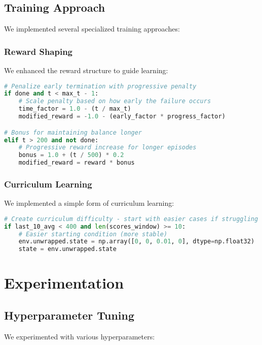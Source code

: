 \documentclass[11pt,a4paper]{article}
\begin{document}
\subsection{Training Approach}

We implemented several specialized training approaches:

\subsubsection{Reward Shaping}
We enhanced the reward structure to guide learning:

\begin{lstlisting}[language=Python, caption=Reward Shaping]
# Penalize early termination with progressive penalty
if done and t < max_t - 1:
    # Scale penalty based on how early the failure occurs
    time_factor = 1.0 - (t / max_t)
    modified_reward = -1.0 - (early_factor * progress_factor)

# Bonus for maintaining balance longer
elif t > 200 and not done:
    # Progressive reward increase for longer episodes
    bonus = 1.0 + (t / 500) * 0.2
    modified_reward = reward * bonus
\end{lstlisting}

\subsubsection{Curriculum Learning}
We implemented a simple form of curriculum learning:

\begin{lstlisting}[language=Python, caption=Curriculum Learning]
# Create curriculum difficulty - start with easier cases if struggling
if last_10_avg < 400 and len(scores_window) >= 10:
    # Easier starting condition (more stable)
    env.unwrapped.state = np.array([0, 0, 0.01, 0], dtype=np.float32)
    state = env.unwrapped.state
\end{lstlisting}

\section{Experimentation}

\subsection{Hyperparameter Tuning}

We experimented with various hyperparameters:
\end{document}
